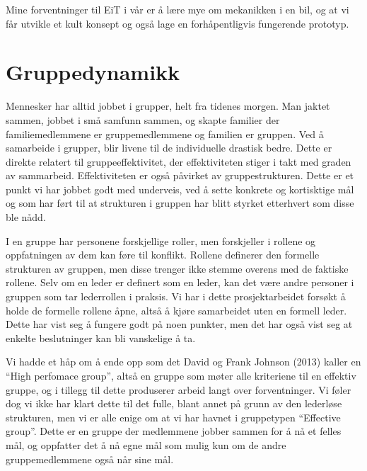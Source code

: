 Mine forventninger til EiT i vår er å lære mye om mekanikken i en bil, og at 
vi får utvikle et kult konsept og også lage en forhåpentligvis fungerende prototyp.

\section{Gruppedynamikk}
Mennesker har alltid jobbet i grupper, helt fra tidenes morgen. Man jaktet 
sammen, jobbet i små samfunn sammen, og skapte familier der familiemedlemmene 
er gruppemedlemmene og familien er gruppen. Ved å samarbeide i grupper, blir 
livene til de individuelle drastisk bedre. Dette er direkte relatert til 
gruppeeffektivitet, der effektiviteten stiger i takt med graden av 
sammarbeid. Effektiviteten er også påvirket av gruppestrukturen. Dette er et 
punkt vi har jobbet godt med underveis, ved å sette konkrete og kortisktige 
mål og som har ført til at strukturen i gruppen har blitt styrket etterhvert 
som disse ble nådd.

I en gruppe har personene forskjellige roller, men 
forskjeller i rollene og oppfatningen av dem kan føre til konflikt. Rollene 
definerer den formelle strukturen av gruppen, men disse trenger ikke stemme 
overens med de faktiske rollene. Selv om en leder er definert som en leder, 
kan det være andre personer i gruppen som tar lederrollen i praksis. 
Vi har i dette prosjektarbeidet forsøkt å holde de formelle rollene åpne, 
altså å kjøre samarbeidet uten en formell leder. Dette har vist seg å 
fungere godt på noen punkter, men det har også vist seg at enkelte 
beslutninger kan bli vanskelige å ta. 

Vi hadde et håp om å ende opp som det 
David og Frank Johnson (2013) kaller en ``High perfomace group'', altså en 
gruppe som møter alle kriteriene til en effektiv gruppe, og i tillegg til 
dette produserer arbeid langt over forventninger. Vi føler dog vi ikke har 
klart dette til det fulle, blant annet på grunn av den lederløse
strukturen, men vi er alle enige om at vi har havnet i gruppetypen 
``Effective group''. Dette er en gruppe der medlemmene jobber sammen for å 
nå et felles mål, og oppfatter det å nå egne mål som mulig kun om de andre 
gruppemedlemmene også når sine mål. \cite{Artikkel2}
